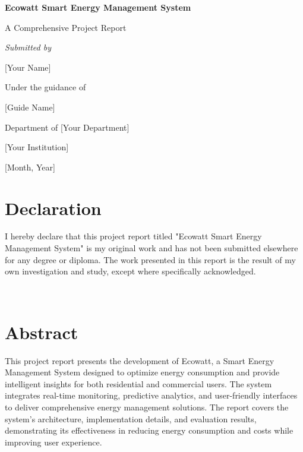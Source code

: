 \documentclass[12pt,a4paper]{report}
\begin{document}
\begin{titlepage}
    \centering
    \vspace*{2cm}
    {\Huge\bfseries Ecowatt Smart Energy Management System\par}
    \vspace{1cm}
    {\Large A Comprehensive Project Report\par}
    \vspace{2cm}
    {\Large\itshape Submitted by\par}
    \vspace{0.5cm}
    {\Large [Your Name]\par}
    \vspace{2cm}
    {\Large Under the guidance of\par}
    \vspace{0.5cm}
    {\Large [Guide Name]\par}
    \vspace{2cm}
    {\Large Department of [Your Department]\par}
    \vspace{0.5cm}
    {\Large [Your Institution]\par}
    \vspace{0.5cm}
    {\Large [Month, Year]\par}
\end{titlepage}

\chapter*{Declaration}
I hereby declare that this project report titled "Ecowatt Smart Energy Management System" is my original work and has not been submitted elsewhere for any degree or diploma. The work presented in this report is the result of my own investigation and study, except where specifically acknowledged.

\vspace{2cm}
\begin{flushright}
\\
[Date]
\end{flushright}

\chapter*{Abstract}
This project report presents the development of Ecowatt, a Smart Energy Management System designed to optimize energy consumption and provide intelligent insights for both residential and commercial users. The system integrates real-time monitoring, predictive analytics, and user-friendly interfaces to deliver comprehensive energy management solutions. The report covers the system's architecture, implementation details, and evaluation results, demonstrating its effectiveness in reducing energy consumption and costs while improving user experience.
\end{document}
